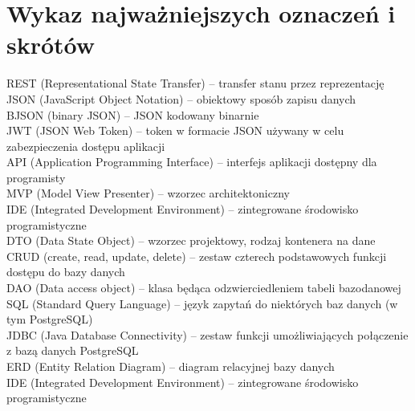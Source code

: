 \chapter*{Wykaz najważniejszych oznaczeń i skrótów}
\noindent REST (Representational State Transfer) -- transfer stanu przez reprezentację \\
JSON (JavaScript Object Notation) -- obiektowy sposób zapisu danych \\
BJSON (binary JSON) -- JSON kodowany binarnie \\
JWT (JSON Web Token) -- token w formacie JSON używany w celu zabezpieczenia dostępu aplikacji \\
API (Application Programming Interface) -- interfejs aplikacji dostępny dla programisty \\
MVP (Model View Presenter) -- wzorzec architektoniczny\\
IDE (Integrated Development Environment) -- zintegrowane środowisko programistyczne\\
DTO (Data State Object) -- wzorzec projektowy, rodzaj kontenera na dane\\
CRUD (create, read, update, delete) -- zestaw czterech podstawowych funkcji dostępu do bazy danych \\
DAO (Data access object) -- klasa będąca odzwierciedleniem tabeli bazodanowej \\
SQL (Standard Query Language) -- język zapytań do niektórych baz danych (w tym PostgreSQL) \\
JDBC (Java Database Connectivity) -- zestaw funkcji umożliwiających połączenie z bazą danych PostgreSQL \\
ERD (Entity Relation Diagram) -- diagram relacyjnej bazy danych \\
IDE (Integrated Development Environment) -- zintegrowane środowisko programistyczne \\
